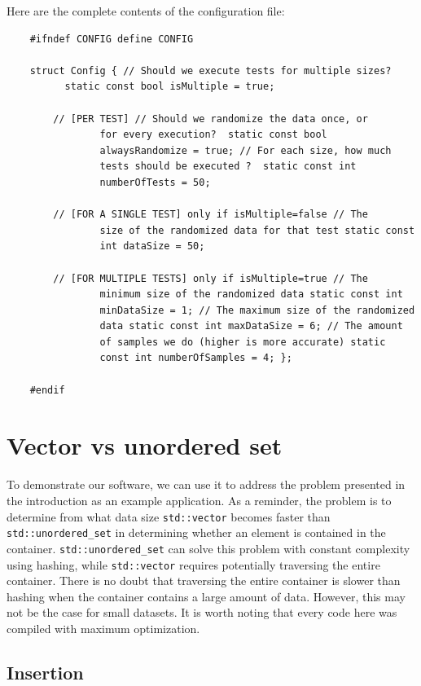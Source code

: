 \documentclass[conference]{IEEEtran} \IEEEoverridecommandlockouts
\def\code#1{\texttt{#1}}
\begin{document}
Here are the complete contents of the configuration file:
\begin{lstlisting}
	#ifndef CONFIG define CONFIG
	
	struct Config { // Should we execute tests for multiple sizes?
          static const bool isMultiple = true;
		
		// [PER TEST] // Should we randomize the data once, or
                for every execution?  static const bool
                alwaysRandomize = true; // For each size, how much
                tests should be executed ?  static const int
                numberOfTests = 50;
		
		// [FOR A SINGLE TEST] only if isMultiple=false // The
                size of the randomized data for that test static const
                int dataSize = 50;
		
		// [FOR MULTIPLE TESTS] only if isMultiple=true // The
                minimum size of the randomized data static const int
                minDataSize = 1; // The maximum size of the randomized
                data static const int maxDataSize = 6; // The amount
                of samples we do (higher is more accurate) static
                const int numberOfSamples = 4; };
	
	#endif
\end{lstlisting}

\section{Vector vs unordered set}

To demonstrate our software, we can use it to address the problem 
presented in the
introduction as an example application. As a reminder, the problem is
to determine from what data size \code{std::vector} becomes faster
than \code{std::unordered\_set} in determining whether an element is
contained in the container. \code{std::unordered\_set} can solve this
problem with constant complexity using hashing, while
\code{std::vector} requires potentially traversing the entire
container. There is no doubt that traversing the entire container is
slower than hashing when the container contains a large amount of
data. However, this may not be the case for small datasets. It is 
worth noting that every code here was compiled with maximum 
optimization.

\subsection{Insertion}
\end{document}
